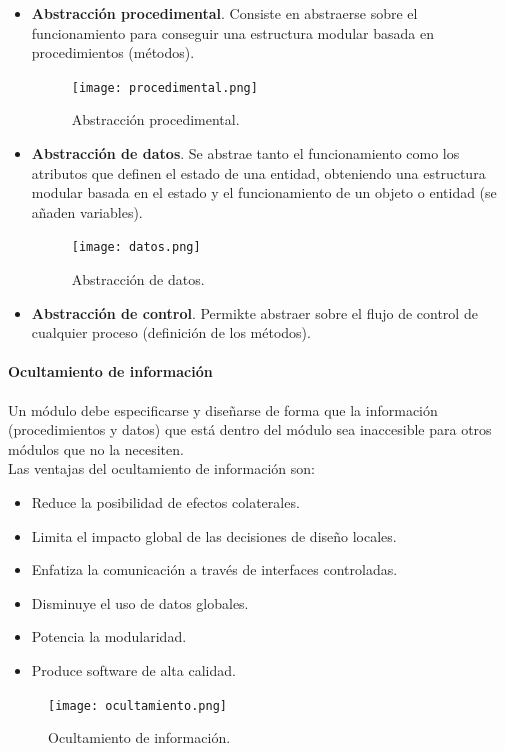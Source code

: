 \documentclass[12pt,spanish]{article}
\begin{document}
\begin{itemize}
	\item \textbf{Abstracción procedimental}. Consiste en abstraerse sobre el funcionamiento para conseguir una estructura modular basada en procedimientos (métodos).
	\begin{figure}[H]
	\centering
	\texttt{[image: procedimental.png]}
	\caption{Abstracción procedimental.}
	\end{figure}
	\item \textbf{Abstracción de datos}. Se abstrae tanto el funcionamiento como los atributos que definen el estado de una entidad, obteniendo una estructura modular basada en el estado y el funcionamiento de un objeto o entidad (se añaden variables).
	\begin{figure}[H]
	\centering
	\texttt{[image: datos.png]}
	\caption{Abstracción de datos.}
	\end{figure}
	\item \textbf{Abstracción de control}. Permikte abstraer sobre el flujo de control de cualquier proceso (definición de los métodos).
\end{itemize}

\paragraph{Ocultamiento de información\\}

Un módulo debe especificarse y diseñarse de forma que la información (procedimientos y datos) que está dentro del módulo sea inaccesible para otros módulos que no la necesiten.\\

Las ventajas del ocultamiento de información son:

\begin{itemize}
	\item Reduce la posibilidad de efectos colaterales.
	\item Limita el impacto global de las decisiones de diseño locales.
	\item Enfatiza la comunicación a través de interfaces controladas.
	\item Disminuye el uso de datos globales.
	\item Potencia la modularidad.
	\item Produce software de alta calidad.
\end{itemize}

\begin{figure}[H]
\centering
\texttt{[image: ocultamiento.png]}
\caption{Ocultamiento de información.}
\end{figure}
\end{document}
